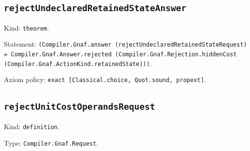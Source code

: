 \documentclass[11pt]{article}
\begin{document}
\subsection*{\texttt{rejectUndeclaredRetainedStateAnswer}}
\noindent Kind: \texttt{theorem}.\par
\noindent Statement: \texttt{(Compiler.Gnaf.answer (rejectUndeclaredRetainedStateRequest) = Compiler.Gnaf.Answer.rejected (Compiler.Gnaf.Rejection.hiddenCost (Compiler.Gnaf.ActionKind.retainedState)))}.\par
\noindent Axiom policy: \texttt{exact [Classical.choice, Quot.sound, propext]}.\par
\subsection*{\texttt{rejectUnitCostOperandsRequest}}
\noindent Kind: \texttt{definition}.\par
\noindent Type: \texttt{Compiler.Gnaf.Request}.\par
\end{document}
